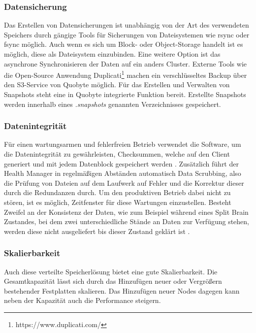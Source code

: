 \subsubsection{Datensicherung}
Das Erstellen von Datensicherungen ist unabhängig von der Art des verwendeten Speichers durch gängige Tools für Sicherungen von Dateisystemen wie rsync oder fsync möglich. Auch wenn es sich um Block- oder Object-Storage handelt ist es möglich, diese als Dateisystem einzubinden. Eine weitere Option ist das asynchrone Synchronisieren der Daten auf ein anders Cluster. Externe Tools wie die Open-Source Anwendung Duplicati\footnote{https://www.duplicati.com/} machen ein verschlüsseltes Backup über den S3-Service von Quobyte möglich. Für das Erstellen und Verwalten von Snapshots steht eine in Quobyte integrierte Funktion bereit. Erstellte Snapshots werden innerhalb eines \textit{.snapshots} genannten Verzeichnisses gespeichert.

\subsubsection{Datenintegrität}
Für einen wartungsarmen und fehlerfreien Betrieb verwendet die Software, um die Datenintegrität zu gewährleisten, Checksummen, welche auf den Client generiert und mit jedem Datenblock gespeichert werden \cite{quobyte:whitepaper}. Zusätzlich führt der Health Manager in regelmäßigen Abständen automatisch Data Scrubbing, also die Prüfung von Dateien auf dem Laufwerk auf Fehler und die Korrektur dieser durch die Redundanzen durch. Um den produktiven Betrieb dabei nicht zu stören, ist es möglich, Zeitfenster für diese Wartungen einzustellen. 
Besteht Zweifel an der Konsistenz der Daten, wie zum Beispiel während eines Split Brain Zustandes, bei dem zwei unterschiedliche Stände an Daten zur Verfügung stehen, werden diese nicht ausgeliefert bis dieser Zustand geklärt ist \cite{quobyte:whitepaper}.

\subsubsection{Skalierbarkeit}
Auch diese verteilte Speicherlösung bietet eine gute Skalierbarkeit. Die Gesamtkapazität lässt sich durch das Hinzufügen neuer oder Vergrößern bestehender Festplatten skalieren. Das Hinzufügen neuer Nodes dagegen kann neben der Kapazität auch die Performance steigern.

